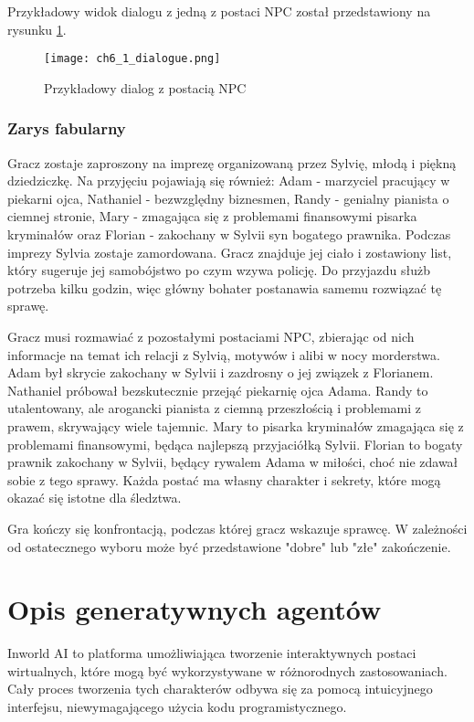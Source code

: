 Przykładowy widok dialogu z jedną z postaci NPC został przedstawiony na rysunku \ref{fig:ch6_1_dialogue}.

\begin{figure}[h!]
    \centering
    \texttt{[image: ch6\_1\_dialogue.png]}
    \caption{Przykładowy dialog z postacią NPC}
    \label{fig:ch6_1_dialogue}
\end{figure}

\subsubsection*{Zarys fabularny}

Gracz zostaje zaproszony na imprezę organizowaną przez Sylvię, młodą i piękną dziedziczkę. Na
przyjęciu pojawiają się również: Adam - marzyciel pracujący w piekarni ojca, Nathaniel -
bezwzględny biznesmen, Randy - genialny pianista o ciemnej stronie, Mary - zmagająca się z
problemami finansowymi pisarka kryminałów oraz Florian - zakochany w Sylvii syn bogatego prawnika.
Podczas imprezy Sylvia zostaje zamordowana. Gracz znajduje jej ciało i zostawiony list, który
sugeruje jej samobójstwo po czym wzywa policję. Do przyjazdu służb potrzeba kilku godzin, więc
główny bohater postanawia samemu rozwiązać tę sprawę.

Gracz musi rozmawiać z pozostałymi postaciami NPC, zbierając od nich informacje na temat ich
relacji z Sylvią, motywów i alibi w nocy morderstwa. Adam był skrycie zakochany w Sylvii i
zazdrosny o jej związek z Florianem. Nathaniel próbował bezskutecznie przejąć piekarnię ojca Adama.
Randy to utalentowany, ale arogancki pianista z ciemną przeszłością i problemami z prawem,
skrywający wiele tajemnic. Mary to pisarka kryminałów zmagająca się z problemami finansowymi,
będąca najlepszą przyjaciółką Sylvii. Florian to bogaty prawnik zakochany w Sylvii, będący rywalem
Adama w miłości, choć nie zdawał sobie z tego sprawy. Każda postać ma własny charakter i sekrety,
które mogą okazać się istotne dla śledztwa.

Gra kończy się konfrontacją, podczas której gracz wskazuje sprawcę.
W zależności od ostatecznego wyboru może być przedstawione "dobre" lub "złe" zakończenie.

\section{Opis generatywnych agentów}\label{section:ch6_2}

Inworld AI to platforma umożliwiająca tworzenie interaktywnych postaci wirtualnych, które mogą być
wykorzystywane w różnorodnych zastosowaniach. Cały proces tworzenia tych charakterów odbywa się za
pomocą intuicyjnego interfejsu, niewymagającego użycia kodu programistycznego.


